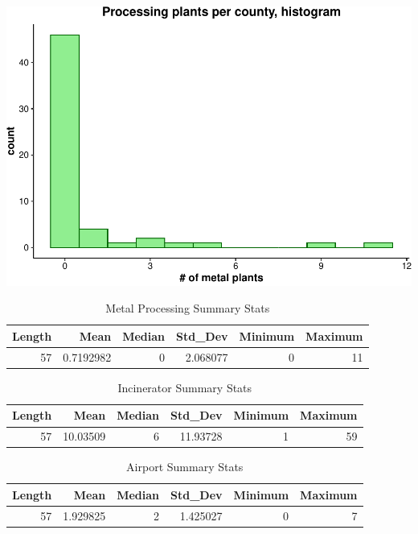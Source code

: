 \documentclass[
  12pt,
]{article}
\begin{document}
\includegraphics{Alcorn_Bao_Hermanson_ENV872_Project_files/figure-latex/setuping section-3.pdf}

\begin{table}[!h]

\caption{\label{tab:sum stats1}Metal Processing Summary Stats}
\centering
\begin{tabular}[t]{rrrrrr}
\toprule
Length & Mean & Median & Std\_Dev & Minimum & Maximum\\
\midrule
57 & 0.7192982 & 0 & 2.068077 & 0 & 11\\
\bottomrule
\end{tabular}
\end{table}
\begin{table}[!h]

\caption{\label{tab:sum stats2}Incinerator Summary Stats}
\centering
\begin{tabular}[t]{rrrrrr}
\toprule
Length & Mean & Median & Std\_Dev & Minimum & Maximum\\
\midrule
57 & 10.03509 & 6 & 11.93728 & 1 & 59\\
\bottomrule
\end{tabular}
\end{table}

\begin{table}[!h]

\caption{\label{tab:sum stats3}Airport Summary Stats}
\centering
\begin{tabular}[t]{rrrrrr}
\toprule
Length & Mean & Median & Std\_Dev & Minimum & Maximum\\
\midrule
57 & 1.929825 & 2 & 1.425027 & 0 & 7\\
\bottomrule
\end{tabular}
\end{table}
\end{document}
